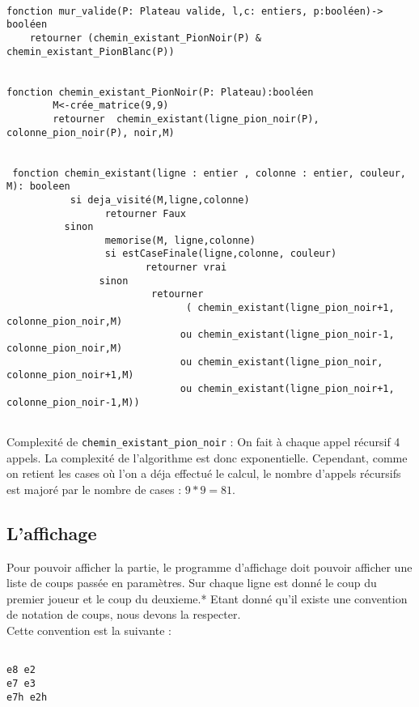 \documentclass[a4paper, draft]{article}
\begin{document}
\begin{verbatim}

fonction mur_valide(P: Plateau valide, l,c: entiers, p:booléen)-> booléen 
    retourner (chemin_existant_PionNoir(P) & chemin_existant_PionBlanc(P))
        
  
fonction chemin_existant_PionNoir(P: Plateau):booléen
        M<-crée_matrice(9,9)
        retourner  chemin_existant(ligne_pion_noir(P), colonne_pion_noir(P), noir,M)


 fonction chemin_existant(ligne : entier , colonne : entier, couleur, M): booleen
           si deja_visité(M,ligne,colonne)
                 retourner Faux
          sinon
                 memorise(M, ligne,colonne)
                 si estCaseFinale(ligne,colonne, couleur)
                        retourner vrai
                sinon
                         retourner
                               ( chemin_existant(ligne_pion_noir+1, colonne_pion_noir,M)
                              ou chemin_existant(ligne_pion_noir-1, colonne_pion_noir,M)
                              ou chemin_existant(ligne_pion_noir, colonne_pion_noir+1,M)
                              ou chemin_existant(ligne_pion_noir+1, colonne_pion_noir-1,M))
 
\end{verbatim}

Complexité de  \verb?chemin_existant_pion_noir? : On fait à chaque appel récursif 4 appels. La complexité de l'algorithme est donc exponentielle. Cependant, comme on retient les cases où l'on a déja effectué le calcul, le nombre d'appels récursifs est majoré par le nombre de cases : $9*9=81$.

\subsection{L'affichage}
Pour pouvoir afficher la partie, le programme d'affichage doit pouvoir afficher une liste de coups passée en paramètres. Sur chaque ligne est donné le coup du premier joueur et le coup du deuxieme.*
Etant donné qu'il existe une convention de notation de coups, nous devons la respecter.\\
Cette convention est la suivante :

\begin{center}
\begin{verbatim}

e8 e2
e7 e3
e7h e2h

\end{verbatim}
\end{center}
\end{document}
